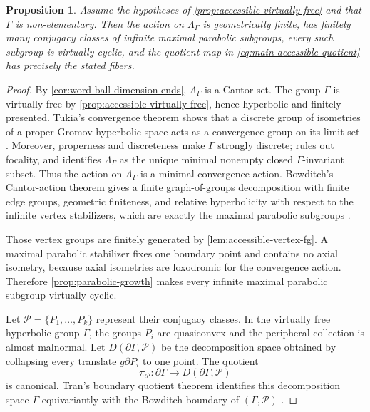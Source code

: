 \documentclass[11pt]{article}
\newtheorem{proposition}[proposition]{Proposition}
\theoremstyle{definition}
\begin{document}
\begin{proposition}
\label{prop:accessible-peripheral-quotient}
Assume the hypotheses of \cref{prop:accessible-virtually-free} and that $\Gamma$ is
non-elementary.  Then the action on $\Lambda_\Gamma$ is geometrically finite, has finitely
many conjugacy classes of infinite maximal parabolic subgroups, every such subgroup is
virtually cyclic, and the quotient map in \eqref{eq:main-accessible-quotient} has precisely the
stated fibers.
\end{proposition}

\begin{proof}
By \cref{cor:word-ball-dimension-ends}, $\Lambda_\Gamma$ is a Cantor set.  The group
$\Gamma$ is virtually free by \cref{prop:accessible-virtually-free}, hence hyperbolic and
finitely presented.  Tukia's convergence theorem shows that a discrete group of isometries of a proper
Gromov-hyperbolic space acts as a convergence group on its limit set
\cite{Tukia1994}.  Moreover, properness and discreteness make $\Gamma$ strongly discrete;
\cite[Proposition~6.4.1]{DasSimmonsUrbanski2017} rules out focality, and
\cite[Corollary~7.4.3(ii)]{DasSimmonsUrbanski2017} identifies $\Lambda_\Gamma$ as the
unique minimal nonempty closed $\Gamma$-invariant subset.  Thus the action on
$\Lambda_\Gamma$ is a minimal convergence action.  Bowditch's Cantor-action theorem gives a finite graph-of-groups decomposition with finite edge
groups, geometric finiteness, and relative hyperbolicity with respect to the infinite vertex
stabilizers, which are exactly the maximal parabolic subgroups
\cite[Theorem~1.3 and pp.~33--34]{Bowditch2002}.

Those vertex groups are finitely generated by \cref{lem:accessible-vertex-fg}.  A maximal
parabolic stabilizer fixes one boundary point and contains no axial isometry, because axial
isometries are loxodromic for the convergence action.  Therefore
\cref{prop:parabolic-growth} makes every infinite maximal parabolic subgroup virtually
cyclic.

Let $\mathcal P=\{P_1,\dots,P_k\}$ represent their conjugacy classes.  In the virtually free
hyperbolic group $\Gamma$, the groups $P_i$ are quasiconvex and the peripheral collection is
almost malnormal.  Let $D(\partial\Gamma,\mathcal P)$ be the decomposition space obtained by
collapsing every translate $g\partial P_i$ to one point.  The quotient
\[
 \pi_{\mathcal P}:\partial\Gamma\longrightarrow
 D(\partial\Gamma,\mathcal P)
\]
is canonical.  Tran's boundary quotient theorem identifies this decomposition space
$\Gamma$-equivariantly with the Bowditch boundary of $(\Gamma,\mathcal P)$
\cite[Main Theorem]{Tran2013}.


\end{proof}
\end{document}
